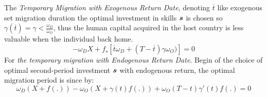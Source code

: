 \documentclass[11pt]{article}
\theoremstyle{prop}
\begin{document}
	The \textit{Temporary Migration with Exogenous Return Date}, denoting $\overline{t}$ like exogenous set migration duration the optimal investment in skills $\hm{s}$ is chosen so $\gamma(\overline{t})= \gamma< \frac{\omega_{D}}{\omega_{O}}$, thus the human capital acquired in the host country is less valuable when the individual back home.
	\begin{equation}
	-\omega_{D}X + f_s [\overline{t}\omega_{D}+(T-\overline{t}) \gamma \omega_{O})] = 0   \tag{7b}  
	\end{equation} 
	For \textit{the temporary migration with Endogenous Return Date}. Begin of the choice of optimal second-period investment $\hm{s}$ with endogenous return, the optimal migration period is since by:
	\begin{equation}
	\omega_D(X + f(.)) - \omega_O (X+ \gamma(t)f(.)) +\omega_O(T-t)\gamma'(t)f(.)= 0
	\end{equation}


	
	
		
\end{document}
